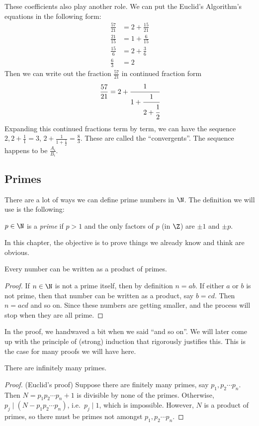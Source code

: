 \documentclass[a4paper]{article}
\begin{document}
These coefficients also play another role. We can put the Euclid's Algorithm's equations in the following form:
\begin{align*}
  \frac{57}{21} &= 2 + \frac{15}{21}\\
  \frac{21}{15} &= 1 + \frac{6}{15}\\
  \frac{15}{6} &= 2 + \frac{3}{6}\\
  \frac{6}{3} &= 2
\end{align*}
Then we can write out the fraction $\frac{57}{21}$ in continued fraction form
\[
  \frac{57}{21} = 2 + \cfrac{1}{1 + \cfrac{1}{2 + \cfrac{1}{2}}}
\]
Expanding this continued fractions term by term, we can have the sequence $2, 2 + \frac{1}{1} = 3$, $2 + \frac{1}{1 + \frac{1}{2}} = \frac{8}{3}$. These are called the ``convergents''. The sequence happens to be $\frac{A_i}{B_i}$.

\subsection{Primes}
There are a lot of ways we can define prime numbers in $\N$. The definition we will use is the following:
\begin{defi}
  $p\in \N$ is a \emph{prime} if $p > 1$ and the only factors of $p$ (in $\Z$) are $\pm 1$ and $\pm p$.
\end{defi}
In this chapter, the objective is to prove things we already know and think are obvious.
\begin{thm}
  Every number can be written as a product of primes.
\end{thm}

\begin{proof}
  If $n\in \N$ is not a prime itself, then by definition $n = ab$. If either $a$ or $b$ is not prime, then that number can be written as a product, say $b = cd$. Then $n = acd$ and so on. Since these numbers are getting smaller, and the process will stop when they are all prime.
\end{proof}
In the proof, we handwaved a bit when we said ``and so on''. We will later come up with the principle of (strong) induction that rigorously justifies this. This is the case for many proofs we will have here.

\begin{thm}
  There are infinitely many primes.
\end{thm}

\begin{proof}
  (Euclid's proof) Suppose there are finitely many primes, say $p_1, p_2 \cdots p_n$. Then $N = p_1p_2\cdots p_n + 1$ is divisible by none of the primes. Otherwise, $p_j\mid (N - p_1p_2\cdots p_n)$, i.e.\ $p_j\mid 1$, which is impossible. However, $N$ is a product of primes, so there must be primes not amongst $p_1, p_2\cdots p_n$.
\end{proof}
\end{document}
